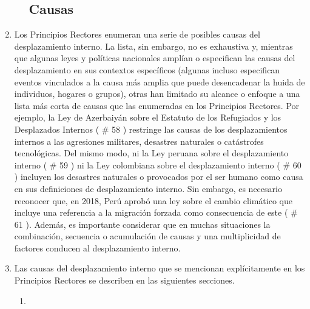 \documentclass[
]{book}
\begin{document}
\begin{enumerate}
\begin{enumerate}
{    \subsection{Causas}\label{causas}}
  \end{enumerate}
\item
  Los Principios Rectores enumeran una serie de posibles causas del desplazamiento interno. La lista, sin embargo, no es exhaustiva y, mientras que algunas leyes y políticas nacionales amplían o especifican las causas del desplazamiento en sus contextos específicos (algunas incluso especifican eventos vinculados a la causa más amplia que puede desencadenar la huida de individuos, hogares o grupos), otras han limitado su alcance o enfoque a una lista más corta de causas que las enumeradas en los Principios Rectores. Por ejemplo, la Ley de Azerbaiyán sobre el Estatuto de los Refugiados y los Desplazados Internos (
  \# 58
  ) restringe las causas de los desplazamientos internos a las agresiones militares, desastres naturales o catástrofes tecnológicas. Del mismo modo, ni la Ley peruana sobre el desplazamiento interno (
  \# 59
  ) ni la Ley colombiana sobre el desplazamiento interno (
  \# 60
  ) incluyen los desastres naturales o provocados por el ser humano como causa en sus definiciones de desplazamiento interno. Sin embargo, es necesario reconocer que, en 2018, Perú aprobó una ley sobre el cambio climático que incluye una referencia a la migración forzada como consecuencia de este (
  \# 61
  ). Además, es importante considerar que en muchas situaciones la combinación, secuencia o acumulación de causas y una multiplicidad de factores conducen al desplazamiento interno.
\item
  Las causas del desplazamiento interno que se mencionan explícitamente en los Principios Rectores se describen en las siguientes secciones.

  \begin{enumerate}
  \def\labelenumii{\arabic{enumii}.}
  \item ~
    \hypertarget{conflicto-armado}{%
}
\end{enumerate}
\end{enumerate}
\end{document}
